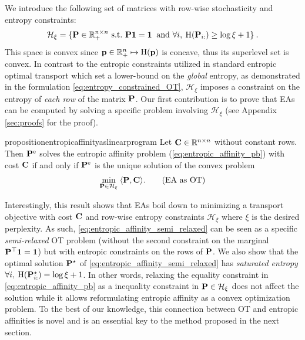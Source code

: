 We introduce the following set of matrices with row-wise stochasticity and entropy constraints:
\begin{align}
  \mathcal{H}_\xi = \{\Pb \in \mathbb{R}_+^{n \times n} \ \text{s.t.} \ \Pb \bm{1} = \bm{1} \: \ \text{and} \  \forall i, \: \operatorname{H}(\Pb_{i:}) \geq \log{\xi} + 1 \}\:.
\end{align}
This space is convex since $\mathbf{p} \in \mathbb{R}_+^n \mapsto \operatorname{H}(\mathbf{p})$ is concave, thus its superlevel set is convex. In contrast to the entropic constraints utilized in standard entropic optimal transport which set a lower-bound on the \emph{global} entropy, as demonstrated in the formulation \eqref{eq:entropy_constrained_OT}, $\mathcal{H}_\xi$ imposes a constraint on the entropy of \emph{each row} of the matrix $\mathbf{P}$.
Our first contribution is to prove that EAs can be computed by solving a specific problem involving $\mathcal{H}_\xi$ (see Appendix \ref{sec:proofs} for the proof).
\begin{restatable}{proposition}{entropicaffinityaslinearprogram}
\label{prop:entropic_affinity_as_linear_program}
Let $\mathbf{C} \in \mathbb{R}^{n \times n}$ without constant rows. Then $\mathbf{P}^{\mathrm{e}}$ solves the entropic affinity problem (\ref{eq:entropic_affinity_pb}) with cost $\mathbf{C}$ if and only if $\mathbf{P}^{\mathrm{e}}$ is the unique solution of the convex problem
\begin{equation}\label{eq:entropic_affinity_semi_relaxed}
    \min_{\mathbf{P} \in \mathcal{H}_{\xi}} \: \langle \mathbf{P}, \mathbf{C} \rangle .
    \tag{EA as OT}
\end{equation}
\end{restatable}
Interestingly, this result shows that EAs boil down to minimizing a transport objective with cost $\mathbf{C}$ and row-wise entropy constraints $\mathcal{H}_{\xi}$ where
$\xi$ is the desired perplexity. As such, \eqref{eq:entropic_affinity_semi_relaxed} can be seen as a specific \emph{semi-relaxed} OT problem \citep{rabin2014adaptive,flamary2016optimal} (\ie without the second constraint on the marginal $\mathbf{P}^\top \bm{1}= \bm{1}$) but with entropic constraints on the rows of $\mathbf{P}$. We also show that the optimal solution $\mathbf{P}^\star$ of \eqref{eq:entropic_affinity_semi_relaxed} has \emph{saturated entropy} \ie $\forall i, \: \operatorname{H}(\mathbf{P}^\star_{i:}) = \log{\xi} + 1$. In other words, relaxing the equality constraint in \eqref{eq:entropic_affinity_pb} as a inequality constraint in $\mathbf{P} \in \mathcal{H}_{\xi}$ does not affect the solution while it allows reformulating entropic affinity as a convex optimization problem. To the best of our knowledge, this connection between OT and entropic affinities is novel and is an essential key to the method proposed in the
next section.

